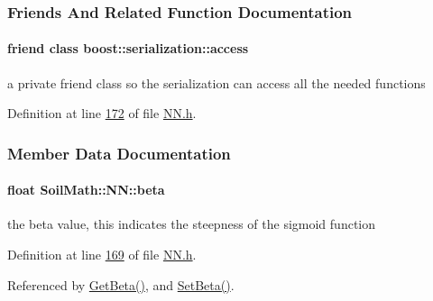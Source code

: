 \subsubsection{Friends And Related Function Documentation}
\hypertarget{class_soil_math_1_1_n_n_ac98d07dd8f7b70e16ccb9a01abf56b9c}{}
\paragraph[{boost\+::serialization\+::access}]{\setlength{\rightskip}{0pt plus 5cm}friend class boost\+::serialization\+::access\hspace{0.3cm}{\ttfamily [friend]}}\label{class_soil_math_1_1_n_n_ac98d07dd8f7b70e16ccb9a01abf56b9c}
a private friend class so the serialization can access all the needed functions 

Definition at line \hyperlink{_n_n_8h_source_l00172}{172} of file \hyperlink{_n_n_8h_source}{N\+N.\+h}.



\subsubsection{Member Data Documentation}
\hypertarget{class_soil_math_1_1_n_n_a4bb773955d78fa6f064b39a9149b78c8}{}
\paragraph[{beta}]{\setlength{\rightskip}{0pt plus 5cm}float Soil\+Math\+::\+N\+N\+::beta\hspace{0.3cm}{\ttfamily [private]}}\label{class_soil_math_1_1_n_n_a4bb773955d78fa6f064b39a9149b78c8}
the beta value, this indicates the steepness of the sigmoid function 

Definition at line \hyperlink{_n_n_8h_source_l00169}{169} of file \hyperlink{_n_n_8h_source}{N\+N.\+h}.



Referenced by \hyperlink{_n_n_8h_source_l00102}{Get\+Beta()}, and \hyperlink{_n_n_8h_source_l00101}{Set\+Beta()}.

\hypertarget{class_soil_math_1_1_n_n_aee7f8d1feb35f3230c10894dacf69740}{}
